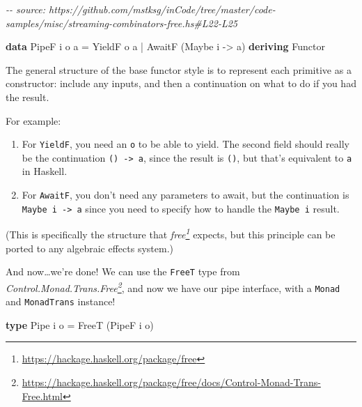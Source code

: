 \documentclass[]{article}
\newenvironment{Shaded}{}{}
\newcommand{\CommentTok}[1]{\textcolor[rgb]{0.38,0.63,0.69}{\textit{#1}}}
\newcommand{\DataTypeTok}[1]{\textcolor[rgb]{0.56,0.13,0.00}{#1}}
\newcommand{\KeywordTok}[1]{\textcolor[rgb]{0.00,0.44,0.13}{\textbf{#1}}}
\newcommand{\NormalTok}[1]{#1}
\newcommand{\OperatorTok}[1]{\textcolor[rgb]{0.40,0.40,0.40}{#1}}
\newcommand{\OtherTok}[1]{\textcolor[rgb]{0.00,0.44,0.13}{#1}}
\renewcommand{\href}[2]{#2\footnote{\url{#1}}}
\begin{document}
\begin{Shaded}
\begin{Highlighting}[]
\CommentTok{{-}{-} source: https://github.com/mstksg/inCode/tree/master/code{-}samples/misc/streaming{-}combinators{-}free.hs\#L22{-}L25}

\KeywordTok{data} \DataTypeTok{PipeF}\NormalTok{ i o a }\OtherTok{=}
    \DataTypeTok{YieldF}\NormalTok{ o a}
  \OperatorTok{|} \DataTypeTok{AwaitF}\NormalTok{ (}\DataTypeTok{Maybe}\NormalTok{ i }\OtherTok{{-}>}\NormalTok{ a)}
    \KeywordTok{deriving} \DataTypeTok{Functor}
\end{Highlighting}
\end{Shaded}

The general structure of the base functor style is to represent each primitive
as a constructor: include any inputs, and then a continuation on what to do if
you had the result.

For example:

\begin{enumerate}
\def\labelenumi{\arabic{enumi}.}
\tightlist
\item
  For \texttt{YieldF}, you need an \texttt{o} to be able to yield. The second
  field should really be the continuation \texttt{()\ -\textgreater{}\ a}, since
  the result is \texttt{()}, but that's equivalent to \texttt{a} in Haskell.
\item
  For \texttt{AwaitF}, you don't need any parameters to await, but the
  continuation is \texttt{Maybe\ i\ -\textgreater{}\ a} since you need to
  specify how to handle the \texttt{Maybe\ i} result.
\end{enumerate}

(This is specifically the structure that
\emph{\href{https://hackage.haskell.org/package/free}{free}} expects, but this
principle can be ported to any algebraic effects system.)

And now\ldots we're done! We can use the \texttt{FreeT} type from
\emph{\href{https://hackage.haskell.org/package/free/docs/Control-Monad-Trans-Free.html}{Control.Monad.Trans.Free}},
and now we have our pipe interface, with a \texttt{Monad} and
\texttt{MonadTrans} instance!

\begin{Shaded}
\begin{Highlighting}[]
\KeywordTok{type} \DataTypeTok{Pipe}\NormalTok{ i o }\OtherTok{=} \DataTypeTok{FreeT}\NormalTok{ (}\DataTypeTok{PipeF}\NormalTok{ i o)}
\end{Highlighting}
\end{Shaded}
\end{document}
